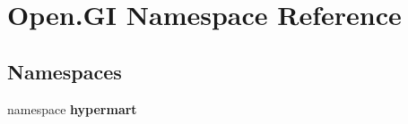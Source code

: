 \section{Open.\+GI Namespace Reference}
\label{namespace_open_1_1_g_i}
\subsection*{Namespaces}
\begin{DoxyCompactItemize}
\item 
namespace \textbf{ hypermart}
\end{DoxyCompactItemize}
